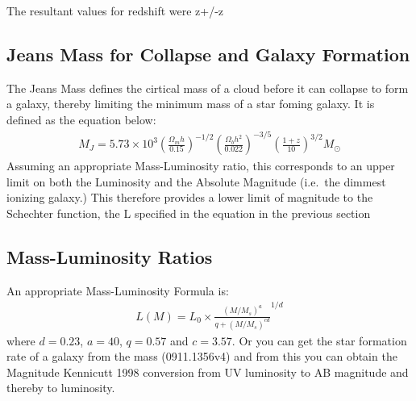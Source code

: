 		The resultant values for redshift were z+/-z

	\subsection{Jeans Mass for Collapse and Galaxy Formation} %
	\label{sub:jeans_mass_for_collapse_and_galaxy_formation}
		The Jeans Mass defines the cirtical mass of a cloud before it can collapse to form a galaxy, thereby limiting the minimum mass of a star foming galaxy. It is defined as the equation below:
		\begin{align}
			M_J = 5.73\times 10^3{\left(\frac{\Omega_m h}{0.15} \right)}^{-1/2} {\left( \frac{\Omega_b h^2}{0.022}\right)}^{-3/5} {\left( \frac{1+z}{10} \right)}^{3/2} M_\odot
		\end{align}
		Assuming an appropriate Mass-Luminosity ratio, this corresponds to an upper limit on both the Luminosity and the Absolute Magnitude (i.e.\ the dimmest ionizing galaxy.) This therefore provides a lower limit of magnitude to the Schechter function, the L specified in the equation in the previous section


	\subsection{Mass-Luminosity Ratios} %
	\label{sub:mass_luminosity_ratios}
		An appropriate Mass-Luminosity Formula is:
		\begin{align}
			L(M) = L_0 \times \frac{{(M/M_s)}^a}{q+{(M/M_s)}^{cd}}^{1/d}
		\end{align}
		where $d=0.23$, $a=40$, $q=0.57$ and $c=3.57$. Or you can get the star formation rate of a galaxy from the mass (0911.1356v4) and from this you can obtain the Magnitude Kennicutt 1998 conversion from UV luminosity to AB magnitude and thereby to luminosity.

